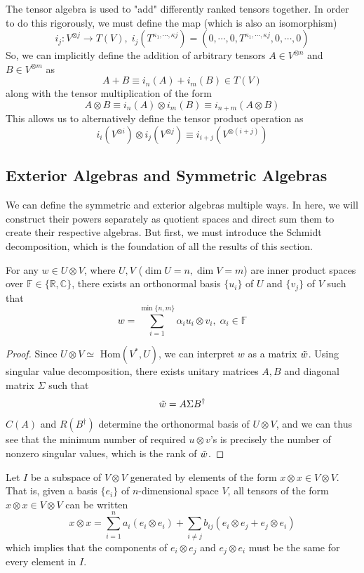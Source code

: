   The tensor algebra is used to "add" differently ranked tensors together. In order to do this rigorously, we must define the map (which is also an isomorphism)
  \[i_j: V^{\otimes j} \longrightarrow T(V), \; i_j (T^{\kappa_1, \cdots, \kappa j}) = (0, \cdots,0, T^{\kappa_1, \cdots, \kappa j}, 0, \cdots, 0) \]
  So, we can implicitly define the addition of arbitrary tensors $A \in V^{\otimes n}$ and $B \in V^{\otimes m}$ as 
  \[ A + B \equiv i_n (A) + i_m (B) \in T(V)\]
  along with the tensor multiplication of the form
  \[ A \otimes B \equiv i_n(A) \otimes i_m(B) \equiv i_{n+m} (A \otimes B)\]
  This allows us to alternatively define the tensor product operation as
  \[i_i(V^{\otimes i}) \otimes i_j( V^{\otimes j}) \equiv i_{i+j} (V^{\otimes (i+j)})\]

\subsection{Exterior Algebras and Symmetric Algebras}

  We can define the symmetric and exterior algebras multiple ways. In here, we will construct their powers separately as quotient spaces and direct sum them to create their respective algebras. But first, we must introduce the Schmidt decomposition, which is the foundation of all the results of this section. 

  \begin{theorem}
    For any $w \in U \otimes V$, where $U, V$ ($\dim{U} = n, \dim{V} = m$)  are inner product spaces over $\mathbb{F} \in \{ \mathbb{R}, \mathbb{C}\}$, there exists an orthonormal basis $\{u_i\}$ of $U$ and $\{v_j\}$ of $V$ such that 
    \[ w = \sum_{i=1}^{\min{\{n, m\}}} \alpha_i u_i \otimes v_i, \; \alpha_i \in \mathbb{F}\]
  \end{theorem}
  \begin{proof}
    Since $U \otimes V \simeq $ Hom$(V^*, U)$, we can interpret $w$ as a matrix $\Tilde{w}$. Using singular value decomposition, there exists unitary matrices $A, B$ and diagonal matrix $\Sigma$ such that
    \[\Tilde{w} = A \Sigma B^\dagger\]
    $C(A)$ and $R(B^\dagger)$ determine the orthonormal basis of $U \otimes V$, and we can thus see that the minimum number of required $u \otimes v$'s is precisely the number of nonzero singular values, which is the rank of $\Tilde{w}$. 
  \end{proof}

  \begin{definition}
    Let $I$ be a subspace of $V \otimes V$ generated by elements of the form $x \otimes x \in V \otimes V$. That is, given a basis $\{e_i\}$ of $n$-dimensional space $V$, all tensors of the form $x \otimes x \in V \otimes V$ can be written 
    \[x \otimes x = \sum_{i=1}^n a_i (e_i \otimes e_i) + \sum_{i \neq j} b_{i j} (e_i \otimes e_j + e_j \otimes e_i)\]
    which implies that the components of $e_i \otimes e_j$ and $e_j \otimes e_i$ must be the same for every element in $I$. 
  \end{definition}

